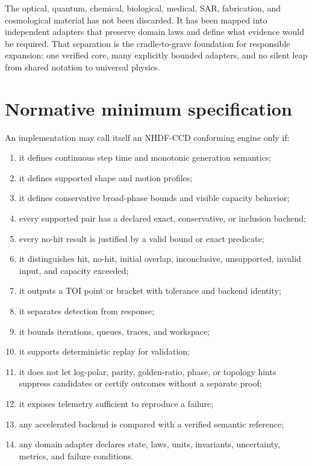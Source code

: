 \documentclass[11pt,a4paper,openany]{book}
\begin{document}
The optical, quantum, chemical, biological, medical, SAR, fabrication, and cosmological material has not been discarded. It has been mapped into independent adapters that preserve domain laws and define what evidence would be required. That separation is the cradle-to-grave foundation for responsible expansion: one verified core, many explicitly bounded adapters, and no silent leap from shared notation to universal physics.

\appendix
\chapter{Normative minimum specification}
An implementation may call itself an NHDF-CCD conforming engine only if:
\begin{enumerate}
  \item it defines continuous step time and monotonic generation semantics;
  \item it defines supported shape and motion profiles;
  \item it defines conservative broad-phase bounds and visible capacity behavior;
  \item every supported pair has a declared exact, conservative, or inclusion backend;
  \item every no-hit result is justified by a valid bound or exact predicate;
  \item it distinguishes hit, no-hit, initial overlap, inconclusive, unsupported, invalid input, and capacity exceeded;
  \item it outputs a TOI point or bracket with tolerance and backend identity;
  \item it separates detection from response;
  \item it bounds iterations, queues, traces, and workspace;
  \item it supports deterministic replay for validation;
  \item it does not let log-polar, parity, golden-ratio, phase, or topology hints suppress candidates or certify outcomes without a separate proof;
  \item it exposes telemetry sufficient to reproduce a failure;
  \item any accelerated backend is compared with a verified semantic reference;
  \item any domain adapter declares state, laws, units, invariants, uncertainty, metrics, and failure conditions.
\end{enumerate}
\end{document}
